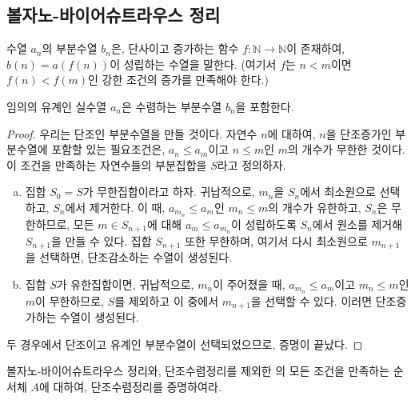 \subsection{볼자노-바이어슈트라우스 정리}
\begin{definition}
\label{def:subseq}
    수열 $a_n$의 부분수열 $b_n$은, 단사이고 증가하는 함수 $f: \mathbb{N} \to \mathbb{N}$이 존재하여, $b(n) = a(f(n))$이 성립하는 수열을 말한다.
    (여기서 $f$는 $n < m$이면 $f(n) < f(m)$인 강한 조건의 증가를 만족해야 한다.)
\end{definition}
\begin{theorem}
\label{thm:bolzweier}
    임의의 유계인 실수열 $a_n$은 수렴하는 부분수열 $b_n$을 포함한다.
\end{theorem}
\begin{proof}
    우리는 단조인 부분수열을 만들 것이다.
    자연수 $n$에 대하여, $n$을 단조증가인 부분수열에 포함할 있는 필요조건은, $a_n \leq a_m$이고 $n \leq m$인 $m$의 개수가 무한한 것이다.
    이 조건을 만족하는 자연수들의 부분집합을 $S$라고 정의하자.
    
    \begin{enumerate}[(a)]
        \item 집합 $S_0 = S$가 무한집합이라고 하자.
        귀납적으로, $m_n$을 $S_n$에서 최소원으로 선택하고, $S_n$에서 제거한다.
        이 때, $a_{m_n} \leq a_m$인 $m_n \leq m$의 개수가 유한하고, $S_n$은 무한하므로, 모든 $m \in S_{n + 1}$에 대해 $a_m \leq a_{m_n}$이 성립하도록 $S_n$에서 원소를 제거해 $S_{n + 1}$을 만들 수 있다.
        집합 $S_{n + 1}$ 또한 무한하며, 여기서 다시 최소원으로 $m_{n + 1}$을 선택하면, 단조감소하는 수열이 생성된다.
        \item 집합 $S$가 유한집합이면, 귀납적으로, $m_n$이 주어졌을 때, $a_{m_n} \leq a_m$이고 $m_n \leq m$인 $m$이 무한하므로, $S$를 제외하고 이 중에서 $m_{n + 1}$을 선택할 수 있다.
        이러면 단조증가하는 수열이 생성된다.
    \end{enumerate}
    두 경우에서 단조이고 유계인 부분수열이 선택되었으므로, 증명이 끝났다.
\end{proof}
\begin{exercise}
    볼자노-바이어슈트라우스 정리와, 단조수렴정리를 제외한 의 모든 조건을 만족하는 순서체 $A$에 대하여, 단조수렴정리를 증명하여라.
\end{exercise}

